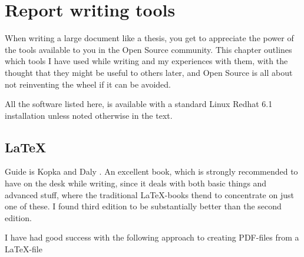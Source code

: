 
\chapter{Report writing tools}

When writing a large document like a thesis, you get to appreciate the
power of the tools available to you in the Open Source community.
This chapter outlines which tools I have used while writing and my
experiences with them, with the thought that they might be useful to
others later, and Open Source is all about not reinventing the wheel
if it can be avoided.  

All the software listed here, is available with a standard Linux
Redhat 6.1 installation unless noted otherwise in the text.


\section{\LaTeX}
\label{sec:report-writing-tools-latex}


Guide is Kopka and Daly \cite{a-guide-to-latex}.  An excellent book,
which is strongly recommended to have on the desk while writing, since
it deals with both basic things and advanced stuff, where the
traditional LaTeX-books thend to concentrate on just one of these.  I
found third edition to be substantially better than the second edition.




I have had good success with the following approach to creating
PDF-files from a \LaTeX-file


